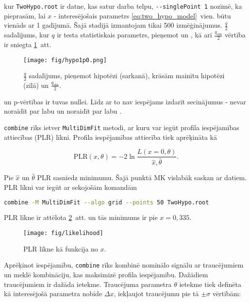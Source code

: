 kur  \lstinline[language=sh]|TwoHypo.root| ir \ROOT datne, kas satur darba telpu, \lstinline[language=sh]|--singlePoint 1| nozīmē, ka pieprasām, lai $x$ - interesējošais parametrs \ref{eq:two_hypo_model}~vien. būtu vienāds ar 1 \Halt gadījumā. Šajā stadijā izmantojam tikai 500 izmēģinājumus. $\frac{q}{2}$ sadalījums, kur $q$ ir testa statistiskais parametrs, pieņemot \Hnull un \Halt, kā arī $\frac{q_{\text{obs}}}{2}$ vērtība ir sniegta \ref{fig:hypo1p0}~att.

\begin{figure}
  \centering
  \texttt{[image: fig/hypo1p0.png]}
  \caption{$\frac{q}{2}$ sadalījums, pieņemot \ttbar hipotēzi (sarkanā), krāsām mainītu \ttbar hipotēzi (zilā) un $\frac{q_{\text{obs}}}{2}$.}
  \label{fig:hypo1p0}
\end{figure}

\Halt un \Hnull p-vērtības ir tuvas nullei. Līdz ar to nav iespējams izdarīt secinājumus - nevar noraidīt \Hnull par labu \Halt un noraidīt \Halt par labu \Hnull.

\lstinline[language=sh]|combine| rīks ietver \lstinline[language=sh]|MultiDimFit| metodi, ar kuru var iegūt profila iespējamības attiecības (PLR) līkni. Profila iespējamības attiecība tiek aprēķināta kā

\begin{equation}
  \text{PLR}(x, \theta)=-2\ln\frac{L(x=0, \theta)}{\hat{x}, \hat{\theta}}.
\end{equation}

Pie $\hat{x}$ un $\hat{\theta}$ PLR sasniedz minimumu. Šajā punktā MK vislabāk saskan ar datiem. PLR līkni var iegūt ar sekojošām komandām

\begin{lstlisting}[language=sh, breaklines=true]
combine -M MultiDimFit --algo grid --points 50 TwoHypo.root
\end{lstlisting}

PLR līkne ir attēlota \ref{fig:likelihood}~att. un tās minimums ir pie $x=0,335$.

\begin{figure}
  \centering
  \texttt{[image: fig/likelihood]}
  \caption{PLR līkne kā funkcija no $x$.}
  \label{fig:likelihood}
\end{figure}

Aprēķinot iespējamību, \lstinline[language=sh]|combine| rīks kombinē nominālo signālu ar traucējumiem un meklē kombināciju, kas maksimizē profila iespējamību. Dažādiem traucējumiem ir dažāda ietekme. Traucējuma parametra $\theta$ ietekme tiek definēta kā interesējošā parametra nobīde $\Delta x$, iekļaujot traucējumu pie tā $\pm\sigma$ vērtībām:

